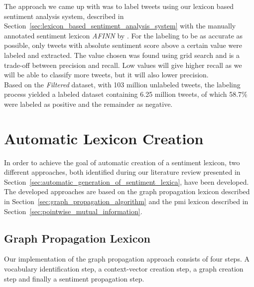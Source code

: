 The approach we came up with was to label tweets using our lexicon based sentiment analysis system, described in Section~\ref{sec:lexicon_based_sentiment_analysis_system} with the manually annotated sentiment lexicon \textit{AFINN} by \cite{AFINN}. For the labeling to be as accurate as possible, only tweets with absolute sentiment score above a certain value were labeled and extracted. The value chosen was found using grid search and is a trade-off between precision and recall. Low values will give higher recall as we will be able to classify more tweets, but it will also lower precision. \\

Based on the \textit{Filtered} dataset, with 103 million unlabeled tweets, the labeling process yielded a labeled dataset containing 6.25 million tweets, of which 58.7\% were labeled as positive and the remainder as negative.


\section{Automatic Lexicon Creation}
In order to achieve the goal of automatic creation of a sentiment lexicon, two different approaches, both identified during our literature review presented in Section~\ref{sec:automatic_generation_of_sentiment_lexica}, have been developed. The developed approaches are based on the graph propagation lexicon described in Section~\ref{sec:graph_propagation_algorithm} and the \ac{pmi} lexicon described in Section~\ref{sec:pointwise_mutual_information}. 


\subsection{Graph Propagation Lexicon}
\label{sec:graph_propagation_lexicon}
Our implementation of the graph propagation approach consists of four steps. A vocabulary identification step, a context-vector creation step, a graph creation step and finally a sentiment propagation step.   


